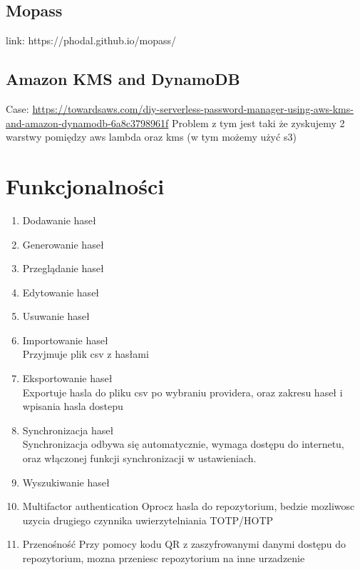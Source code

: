\documentclass[11pt, a4paper]{article}
\begin{document}
\subsection{Mopass}
link: https://phodal.github.io/mopass/


\subsection{Amazon KMS and DynamoDB}
Case: \url{https://towardsaws.com/diy-serverless-password-manager-using-aws-kms-and-amazon-dynamodb-6a8c3798961f}
Problem z tym jest taki że zyskujemy 2 warstwy pomiędzy aws lambda oraz kms (w tym możemy użyć s3)


\section{Funkcjonalności}
\begin{enumerate}
    \item Dodawanie haseł
    \item Generowanie haseł
    \item Przeglądanie haseł
    \item Edytowanie haseł
    \item Usuwanie haseł
    \item Importowanie haseł \\
    Przyjmuje plik csv z hasłami
    \item Eksportowanie haseł \\
    Exportuje hasla do pliku csv po wybraniu providera, oraz zakresu haseł i wpisania hasla dostepu
    \item Synchronizacja haseł \\
    Synchronizacja odbywa się automatycznie, wymaga dostępu do internetu, oraz włączonej funkcji synchronizacji w ustawieniach.
    \item Wyszukiwanie haseł
    \item Multifactor authentication
    Oprocz hasla do repozytorium, bedzie mozliwosc uzycia drugiego czynnika uwierzytelniania TOTP/HOTP
    \item Przenośność
    Przy pomocy kodu QR z zaszyfrowanymi danymi dostępu do repozytorium, mozna przeniesc repozytorium na inne urzadzenie 
\end{enumerate}
\end{document}
